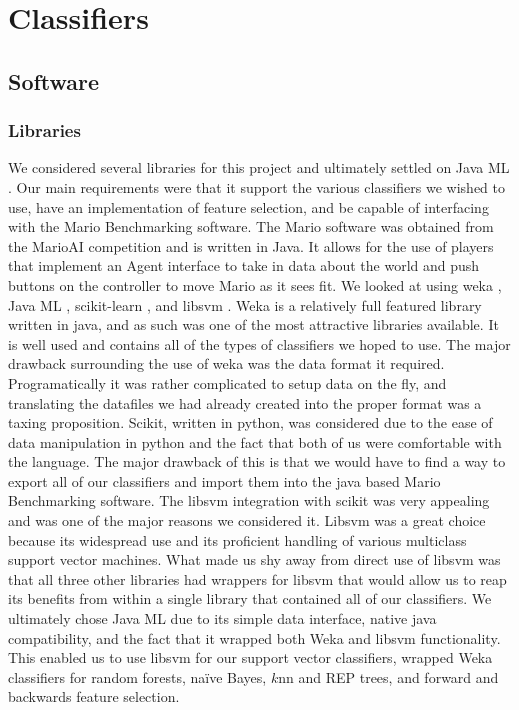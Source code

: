 \documentclass[]{article}   %
\begin{document}
\section{Classifiers}
\label{sec:class}
\subsection{Software}
\subsubsection{Libraries}
We considered several libraries for this project and ultimately settled on Java ML \cite{javaml}. Our main 
requirements were that it support the various classifiers we wished to use, have an implementation of feature 
selection, and be capable of interfacing with the Mario Benchmarking \cite{mariobenchmark} software. The 
Mario software was obtained from the MarioAI competition and is written in Java. It allows for the use of 
players that implement an Agent interface to take in data about the world and push buttons on the controller 
to move Mario as it sees fit. We looked at using weka \cite{weka}, Java ML \cite{javaml}, scikit-learn 
\cite{scikit}, and libsvm \cite{libsvm}. 
\newline\newline
Weka is a relatively full featured library written in java, and as such was one of the most attractive libraries 
available. It is well used and contains all of the types of classifiers we hoped to use. The major drawback 
surrounding the use of weka was the data format it required. Programatically it was rather complicated to setup 
data on the fly, and translating the datafiles we had already created into the proper format was a taxing proposition. 
\newline\newline
Scikit, written in python, was considered due to the ease of data manipulation in python and the fact that both 
of us were comfortable with the language. The major drawback of this is that we would have to find a way to 
export all of our classifiers and import them into the java based Mario Benchmarking software. The libsvm 
integration with scikit was very appealing and was one of the major reasons we considered it.
\newline\newline
Libsvm was a great choice because its widespread use and its proficient handling of various multiclass support 
vector machines. What made us shy away from direct use of libsvm was that all three other libraries had wrappers 
for libsvm that would allow us to reap its benefits from within a single library that contained all of our classifiers.
\newline\newline
We ultimately chose Java ML due to its simple data interface, native java compatibility, and the fact that it 
wrapped both Weka and libsvm functionality. This enabled us to use libsvm for our support vector classifiers, 
wrapped Weka classifiers for random forests, na\"{i}ve Bayes, $k$nn and REP trees, and forward and backwards feature 
selection. 
\end{document}
